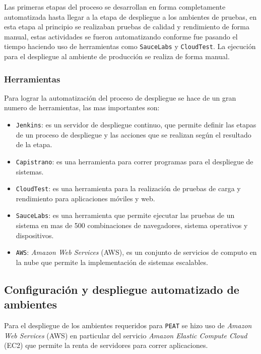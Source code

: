 
Las primeras etapas del proceso se desarrollan en forma completamente automatizada
hasta llegar a la etapa de despliegue a los ambientes de pruebas, en esta etapa
al principio se realizaban pruebas de calidad y rendimiento de forma manual, estas
actividades se fueron automatizando conforme fue pasando el tiempo haciendo uso de
herramientas como \texttt{SauceLabs} y \texttt{CloudTest}. La ejecución para
el despliegue al ambiente de producción se realiza de forma manual.

\subsubsection{Herramientas}

Para lograr la automatización del proceso de despliegue se hace de un gran numero
de herramientas, las mas importantes son:

\begin{itemize}
\item \texttt{Jenkins}: es un servidor de despliegue continuo, que permite
  definir las etapas de un proceso de despliegue y las acciones que se realizan
  según el resultado de la etapa.
\item \texttt{Capistrano}: es una herramienta para correr programas para el
  despliegue de sistemas.
\item \texttt{CloudTest}: es una herramienta para la realización de pruebas de
  carga y rendimiento para aplicaciones móviles y web.
\item \texttt{SauceLabs}: es una herramienta que permite ejecutar las pruebas de un
  sistema en mas de 500 combinaciones de navegadores, sistema operativos
  y dispositivos.
\item \texttt{AWS}: \textit{Amazon Web Services} (AWS), es un conjunto de servicios
  de computo en la nube que permite la implementación de sistemas escalables.
\end{itemize}

\subsection{Configuración y despliegue automatizado de ambientes}

Para el despliegue de los ambientes requeridos para \texttt{PEAT} se hizo uso de
\textit{Amazon Web Services} (AWS) en particular del servicio
\textit{Amazon Elastic Compute Cloud} (EC2) que permite la renta de servidores
para correr aplicaciones.

